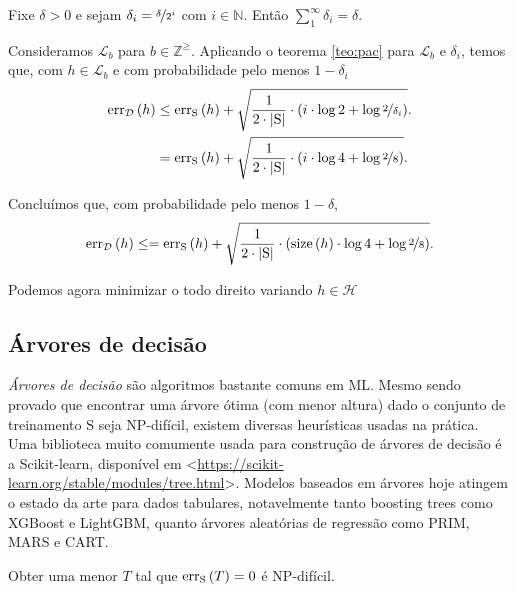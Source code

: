 Fixe $\delta>0$ e sejam $\delta_i=\nicefrac{\delta}{2^i}$ com $i\in\mathds{N}$. Então $\sum_1^\infty \delta_i=\delta$.

Consideramos $\mathcal{L}_b$ para $b\in\mathds{Z}^{\geq}$. Aplicando o teorema \autoref{teo:pac} para $\mathcal{L}_b$ e $\delta_i$, temos que, com $h\in\mathcal{L}_b$ e com probabilidade pelo menos $1-\delta_i$
\begin{align*}
  \mathrm{err}_\mathcal{D}\left(h\vphantom{1j}\right) &\leq \mathrm{err}_\mathrm{S}\left(h\vphantom{1j}\right) + \sqrt{\frac{1}{2\cdot\left|\mathrm{S}\vphantom{1j}\right|}\cdot\left(i\cdot\log2 + \log\nicefrac{2}{\delta_i}\vphantom{1j}\right)}. \\
                                  &= \mathrm{err}_\mathrm{S}\left(h\vphantom{1j}\right) + \sqrt{\frac{1}{2\cdot\left|\mathrm{S}\vphantom{1j}\right|}\cdot\left(i\cdot\log4 + \log\nicefrac{2}{8}\vphantom{1j}\right)}.
\end{align*}

Concluímos que, com probabilidade pelo menos $1-\delta$,
\[
  \mathrm{err}_\mathcal{D}\left(h\vphantom{1j}\right) \leq = \mathrm{err}_\mathrm{S}\left(h\vphantom{1j}\right) + \sqrt{\frac{1}{2\cdot\left|\mathrm{S}\vphantom{1j}\right|}\cdot\left(\mathrm{size}\left(h\vphantom{1j}\right)\cdot\log4 + \log\nicefrac{2}{8}\vphantom{1j}\right)}.
\]

Podemos agora minimizar o todo direito variando $h\in\mathcal{H}$

\subsection{Árvores de decisão}

\textit{Árvores de decisão} são algoritmos bastante comuns em ML. Mesmo sendo provado que encontrar uma árvore ótima (com menor altura) dado o conjunto de treinamento $\mathrm{S}$ seja NP-difícil, existem diversas heurísticas usadas na prática. Uma biblioteca muito comumente usada para construção de árvores de decisão é a Scikit-learn, disponível em <\href{https://scikit-learn.org/stable/modules/tree.html}{https://scikit-learn.org/stable/modules/tree.html}>. Modelos baseados em árvores hoje atingem o estado da arte para dados tabulares, notavelmente tanto boosting trees como XGBoost e LightGBM, quanto árvores aleatórias de regressão como PRIM, MARS e CART.

\begin{fato}
  Obter uma menor $T$ tal que $\mathrm{err}_\mathrm{S}\left(T\vphantom{1j}\right)=0$ é NP-difícil.
\end{fato}

